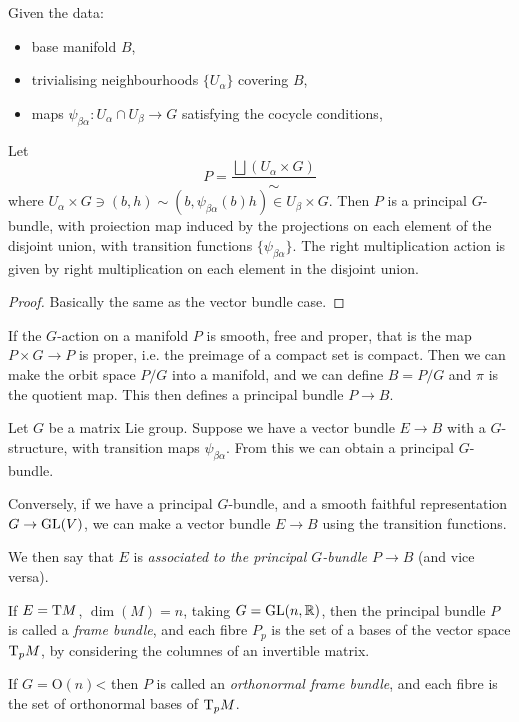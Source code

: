 \documentclass{article}
\begin{document}
\begin{theorem}
    Given the data:
    \begin{itemize}
        \item base manifold \(B\),
        \item trivialising neighbourhoods \(\{U_\alpha\}\) covering \(B\),
        \item maps \(\psi_{\beta\alpha} : U_\alpha \cap U_\beta \to G\) satisfying the cocycle conditions,
    \end{itemize}
    Let
    \[P = \frac{\bigsqcup(U_\alpha \times G)}{\sim}\]
    where \(U_\alpha \times G \ni (b, h) \sim (b, \psi_{\beta\alpha}(b)h) \in U_\beta \times G\). Then \(P\) is a principal \(G\)-bundle, with proiection map induced by the projections on each element of the disjoint union, with transition functions \(\{\psi_{\beta\alpha}\}\). The right multiplication action is given by right multiplication on each element in the disjoint union.
\end{theorem}

\begin{proof}
    Basically the same as the vector bundle case.
\end{proof}

\begin{remark}
    If the \(G\)-action on a manifold \(P\) is smooth, free and proper, that is the map \(P \times G \to P\) is proper, i.e. the preimage of a compact set is compact. Then we can make the orbit space \(P/G\) into a manifold, and we can define \(B = P/G\) and \(\pi\) is the quotient map. This then defines a principal bundle \(P \to B\).
\end{remark}

\begin{remark}
    Let \(G\) be a matrix Lie group. Suppose we have a vector bundle \(E \to B\) with a \(G\)-structure, with transition maps \(\psi_{\beta\alpha}\). From this we can obtain a principal \(G\)-bundle.

    Conversely, if we have a principal \(G\)-bundle, and a smooth faithful representation \(G \to \operatorname{GL}(V)\), we can make a vector bundle \(E \to B\) using the transition functions.

    We then say that \(E\) is \emph{associated to the principal \(G\)-bundle \(P \to B\)} (and vice versa).
\end{remark}

\lec

\begin{example}
    If \(E = \mathrm{T} M\), \(\dim(M) = n\), taking \(G = \operatorname{GL}(n, \mathbb{R})\), then the principal bundle \(P\) is called a \emph{frame bundle}, and each fibre \(P_p\) is the set of a bases of the vector space \(\mathrm{T}_p M\), by considering the columnes of an invertible matrix.

    If \(G = \mathrm O(n)\)< then \(P\) is called an \emph{orthonormal frame bundle}, and each fibre is the set of orthonormal bases of \(\mathrm{T}_pM\).
\end{example}
\end{document}
